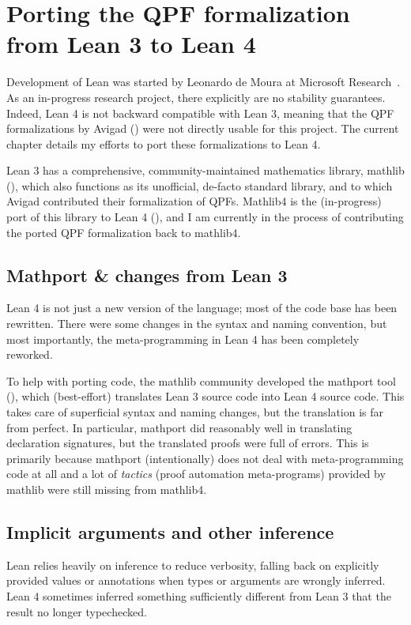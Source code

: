 
\chapter{Porting the QPF formalization from Lean 3 to Lean 4}%
\label{ch:porting}

Development of Lean was started by Leonardo de Moura at Microsoft Research~\cite{demouraLeanTheoremProver2015, avigadTheoremProvingLean}. As an in-progress research project, there explicitly are no stability guarantees. Indeed, Lean 4 is not backward compatible with Lean 3, meaning that the QPF formalizations by Avigad \etal{}
(\cite{avigadDataTypesQuotients2019a}) were not directly usable for this project. The current chapter details my efforts to port these formalizations to Lean 4.



Lean 3 has a comprehensive, community-maintained mathematics library, mathlib (\cite{themathlibcommunityLeanMathematicalLibrary2020}), 
which also functions as its unofficial, de-facto standard library, and to which Avigad \etal{} contributed
their formalization of QPFs.
Mathlib4 is the (in-progress) port of this library to Lean 4 (\cite{mathlib4}),
and I am currently in the process of contributing
the ported QPF formalization back to mathlib4.




\section{Mathport \& changes from Lean 3}
Lean 4 is not just a new version of the language; most of the code base has been rewritten.
There were some changes in the syntax and naming convention, but most importantly, 
the meta-programming in Lean 4 has been completely reworked.

To help with porting code, the mathlib community developed the mathport tool (\cite{mathport}), which 
(best-effort) translates Lean 3 source code into Lean 4 source code. This takes care of superficial 
syntax and naming changes, but the translation is far from perfect.
In particular, mathport did reasonably well in translating declaration signatures, 
but the translated proofs were full of errors.
This is primarily because mathport (intentionally) does not deal with meta-programming code at all and a lot
of \emph{tactics} (proof automation meta-programs) provided by mathlib were still missing from mathlib4.


\section{Implicit arguments and other inference}
Lean relies heavily on inference to reduce verbosity, falling back on explicitly provided
values or annotations when types or arguments are wrongly inferred.
Lean 4 sometimes inferred something sufficiently different from Lean 3 that the result no longer
typechecked.



